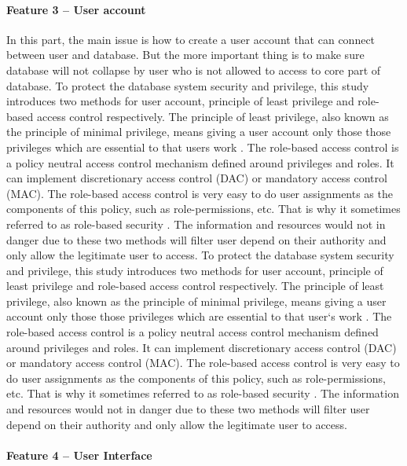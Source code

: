 \paragraph*{Feature 3 -- User account}
\label{task1:feature3}
	
In this part, the main issue is how to create a user account that can connect between user and database. But the more important thing is to make sure database will not collapse by user who is not allowed to access to core part of database.
To protect the database system security and privilege, this study introduces two methods for user account, principle of least privilege and role-based access control respectively. The principle of least privilege, also known as the principle of minimal privilege, means giving a user account only those those privileges which are essential to that users work \cite{PrincipleLeastPrivilege}. The role-based access control is a policy neutral access control mechanism defined around privileges and roles. It can implement discretionary access control (DAC) or mandatory access control (MAC). The role-based access control is very easy to do user assignments as the components of this policy, such as role-permissions, etc. That is why it sometimes referred to as role-based security \cite{RoleBasedAccessControl}. The information and resources would not in danger due to these two methods will filter user depend on their authority and only allow the legitimate user to access.	
To protect the database system security and privilege, this study introduces two methods for user account, principle of least privilege and role-based access control respectively. The principle of least privilege, also known as the principle of minimal privilege, means giving a user account only those those privileges which are essential to that user`s work \cite{PrincipleLeastPrivilege}. The role-based access control is a policy neutral access control mechanism defined around privileges and roles. It can implement discretionary access control (DAC) or mandatory access control (MAC). The role-based access control is very easy to do user assignments as the components of this policy, such as role-permissions, etc. That is why it sometimes referred to as role-based security \cite{RoleBasedAccessControl}. The information and resources would not in danger due to these two methods will filter user depend on their authority and only allow the legitimate user to access.
	
\paragraph*{Feature 4 -- User Interface}
\label{task1:feature4}
	
